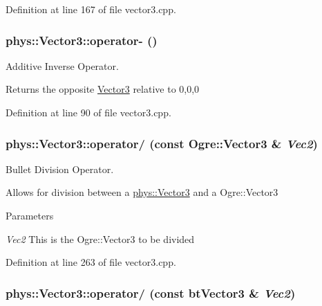 Definition at line 167 of file vector3.cpp.

\hypertarget{classphys_1_1Vector3_afb86ac7edd78353ec3d11d9f2efdf0cb}{
\subsubsection[{operator-\/}]{ phys::Vector3::operator-\/ ()}}
\label{d5/d6a/classphys_1_1Vector3_afb86ac7edd78353ec3d11d9f2efdf0cb}


Additive Inverse Operator. 

Returns the opposite \hyperlink{classphys_1_1Vector3}{Vector3} relative to 0,0,0 

Definition at line 90 of file vector3.cpp.

\hypertarget{classphys_1_1Vector3_a4f9f3240dab2277e8a9b80f6c7235e5b}{
\subsubsection[{operator/}]{ phys::Vector3::operator/ (const Ogre::Vector3 \& {\em Vec2})}}
\label{d5/d6a/classphys_1_1Vector3_a4f9f3240dab2277e8a9b80f6c7235e5b}


Bullet Division Operator. 

Allows for division between a \hyperlink{classphys_1_1Vector3}{phys::Vector3} and a Ogre::Vector3 
\begin{DoxyParams}{Parameters}
\item[{\em Vec2}]This is the Ogre::Vector3 to be divided \end{DoxyParams}


Definition at line 263 of file vector3.cpp.

\hypertarget{classphys_1_1Vector3_a945287bb9448b2353c90e16c6cfed876}{
\subsubsection[{operator/}]{ phys::Vector3::operator/ (const btVector3 \& {\em Vec2})}}
\label{d5/d6a/classphys_1_1Vector3_a945287bb9448b2353c90e16c6cfed876}


